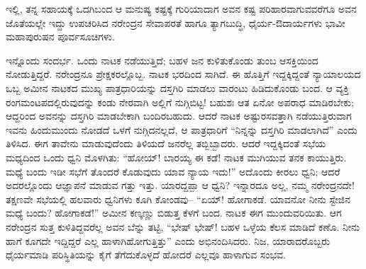 ಇಲ್ಲಿ, ತನ್ನ ಸಹಾಯಕ್ಕೆ ಒದಗಿಬಂದ ಆ ಮನುಷ್ಯ ಕಷ್ಟಕ್ಕೆ ಗುರಿಯಾದಾಗ ಅವನ ಕಷ್ಟ ಪರಿಹಾರವಾಗುವವರೆಗೂ ಅವನ ಜೊತೆಯಲ್ಲೇ ಇದ್ದು ಉಪಚರಿಸಿದ ನರೇಂದ್ರನ ಸೇವಾಪರತೆ ಹಾಗೂ ತ್ಯಾಗಬುದ್ಧಿ, ಧೈರ್ಯ-ಔದಾರ್ಯಗಳು ಭಾವೀ ಮಹಾಪುರುಷನ ಪೂರ್ವಸೂಚಿಗಳು.

ಇನ್ನೊಂದು ಸಂದರ್ಭ. ಒಂದು ನಾಟಕ ನಡೆಯುತ್ತಿದೆ; ಬಹಳ ಜನ ಕುಳಿತುಕೊಂಡು ತುಂಬ ಆಸಕ್ತಿಯಿಂದ ನೋಡುತ್ತಿದ್ದರೆ. ನರೇಂದ್ರನೂ ಪ್ರೇಕ್ಷಕರಲ್ಲೊಬ್ಬ. ನಾಟಕ ಭರದಿಂದ ಸಾಗಿದೆ. ಈ ಹೊತ್ತಿಗೆ ಇದ್ದಕ್ಕಿದ್ದಂತೆ ನ್ಯಾಯಾಲಯದ ಒಬ್ಬ ಅಮೀನ ನಾಟಕದ ಮುಖ್ಯ ಪಾತ್ರಧಾರಿಯನ್ನು ದಸ್ತಗಿರಿ ಮಾಡಲು ವಾರಂಟು ಹಿಡಿದುಕೊಂಡು ಬಂದ. ಆ ವ್ಯಕ್ತಿ ರಂಗಮಂಟಪದಲ್ಲಿರುವುದನ್ನು ಕಂಡು ನೇರವಾಗಿ ಅಲ್ಲಿಗೆ ನುಗ್ಗಿಬಿಟ್ಟ! ಬಹುಶಃ ಆತ ಏನೋ ಅಪರಾಧ ಮಾಡಿರಬೇಕು; ಆದ್ದರಿಂದ ಅವನನ್ನು ದಸ್ತಗಿರಿ ಮಾಡಬೇಕಾಗಿ ಬಂದಿರಬಹುದು. ಆದರೆ ನಾಟಕ ಅಷ್ಟುರಸವತ್ತಾಗಿ ನಡೆಯುತ್ತಿರುವಾಗ ಇವನು ಹಿಂದುಮುಂದು ನೋಡದೆ ಒಳಗೆ ನುಗ್ಗಿದನಲ್ಲದೆ, ಆ ಪಾತ್ರಧಾರಿಗೆ “ನಿನ್ನನ್ನು ದಸ್ತಗಿರಿ ಮಾಡಲಾಗಿದೆ” ಎಂದು ತಿಳಿಸಿದ. ಈಗ ತಾವೇನು ಮಾಡುವುದೆಂದು ತಿಳಿಯದೆ ಜನರೆಲ್ಲ ತಬ್ಬಿಬ್ಬಾದರು. ಆದರೆ ಇದ್ದಕ್ಕಿದಂತೆ ಸಭೆಯ ಮಧ್ಯದಿಂದ ಒಂದು ಧ್ವನಿ ಮೊಳಗಿತು: “ಹೋಯ್! ಬಾರಯ್ಯ ಈ ಕಡೆ! ನಾಟಕ ಮುಗಿಯುವ ತನಕ ಕಾಯುತ್ತಿರು. ಮಧ್ಯೆ ಬಂದು ಇಡೀ ಸಭೆಗೆ ತೊಂದರೆ ಕೊಡುವುದು ಯಾವ ನ್ಯಾಯ ಇದು!” ಅದೊಂದು ಕೀರಲು ಧ್ವನಿ; ಆದರೆ ಅದರಲ್ಲೊಂದು ಆಜ್ಞಾಪನೆ ಮಾಡುವ ಗತ್ತು ಇತ್ತು. ಯಾರದ್ದಪ್ಪಾ ಆ ಧ್ವನಿ? ಇನ್ನಾರದೂ ಅಲ್ಲ, ನಮ್ಮ ನರೇಂದ್ರನದೇ! ತಕ್ಷಣವೇ ಸಭೆಯಲ್ಲಿ ಹಲವಾರು ಧ್ವನಿಗಳು ಕೂಗಿ ಕೋಂಡವು– “ಏಯ್! ಹೋಗಾಕಡೆ. ಯಾವನೋ ನೀನು ಸ್ಟೇಜಿನ ಮಧ್ಯೆ ಬಂದು? ಹೋಗಾಕಡೆ!” ಅಮೀನ ಕಣ್ಕಣ್ಣು ಬಿಡುತ್ತ ಕೆಳಗೆ ಬಂದ. ನಾಟಕ ಈಗ ಮುಂದುವರಿಯಿತು. ಆಗ ನರೇಂದ್ರನ ಸುತ್ತ ಕುಳಿತಿದ್ದವರೆಲ್ಲ ಅವನ ಬೆನ್ನು ತಟ್ಟಿ, “ಭೇಷ್ ಭೇಷ್! ಬಹಳ ಒಳ್ಳೆಯ ಕೆಲಸ ಮಾಡಿದೆ ಕಣೊ. ನೀನು ಹಾಗೆ ಕೂಗದೇ ಇದ್ದಿದ್ದರೆ ಎಲ್ಲ ಹಾಳಾಗಿಹೋಗುತ್ತಿತ್ತು” ಎಂದು ಅಭಿನಂದಿಸಿದರು. ನಿಜ, ಯಾರಾದರೊಬ್ಬರು ಧೈರ್ಯಮಾಡಿ ಪರಿಸ್ಥಿತಿಯನ್ನು ಕೈಗೆ ತೆಗೆದುಕೊಳ್ಳದೆ ಹೋದರೆ ಎಲ್ಲವೂ ಹಾಳಾಗುವ ಸಂಭವ.

